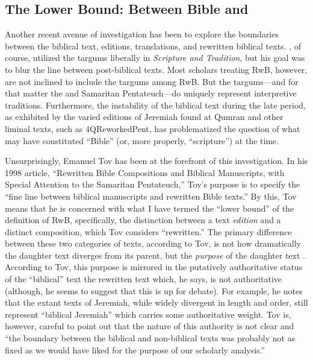 \subsection{The Lower Bound: Between Bible and \RWB}

Another recent avenue of investigation has been to explore the boundaries between the biblical text, editions, translations, and rewritten biblical texts. \vermes, of course, utilized the targums liberally in \emph{Scripture and Tradition}, but his goal was to blur the line between post-biblical texts. Most scholars treating RwB, however, are not inclined to include the targums among RwB. But the targums---and for that matter the \lxx and Samaritan Pentateuch---do uniquely represent interpretive traditions. Furthermore, the instability of the biblical text during the late \secondtemple period, as exhibited by the varied editions of Jeremiah found at Qumran and other liminal texts, such as 4QReworkedPent, has problematized the question of what may have constituted ``Bible'' (or, more properly, ``scripture'') at the time. 

Unsurprisingly, Emanuel Tov has been at the forefront of this investigation. In his 1998 article, ``Rewritten Bible Compositions and Biblical Manuscripts, with Special Attention to the Samaritan Pentateuch,'' Tov's purpose is to specify the ``fine line between biblical manuscripts and rewritten Bible texts.''\autocite[334]{tov_dsd1998} By this, Tov means that he is concerned with what I have termed the ``lower bound'' of the definition of RwB, specifically, the distinction between a text \emph{edition} and a distinct composition, which Tov considers ``rewritten.'' The primary difference between these two categories of texts, according to Tov, is not how dramatically the daughter text diverges from its parent, but the \emph{purpose} of the daughter text \autocite[334]{tov_dsd1998}. According to Tov, this purpose is mirrored in the putatively authoritative status of the ``biblical'' text \visavis the rewritten text which, he says, is not authoritative (although, he seems to suggest that this is up for debate\autocite[337]{tov_dsd1998}). For example, he notes that the extant texts of Jeremiah, while widely divergent in length and order, still represent ``biblical Jeremiah'' which carries some authoritative weight. Tov is, however, careful to point out that the nature of this authority is not clear and ``the boundary between the biblical and non-biblical texts was probably not as fixed as we would have liked for the purpose of our scholarly analysis.''\autocite[335]{tov_dsd1998} 

